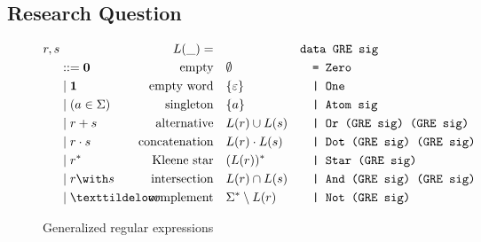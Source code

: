 \subsection{Research Question}
\label{sec:research-question}

\begin{figure}[tp]
  \begin{align*}
    r, s & &L(\_)=\quad &  &
                             \makebox[1em][l]{\texttt{data GRE sig}}\\
         & ::= \Rnull & \ltext{empty}
                        & \emptyset
                           &&\texttt{= Zero}\\
         & \mid \Rempty & \ltext{empty word}
                        & \{ \varepsilon \}
                           && \texttt{| One}\\
         & \mid (a \in \Sigma) & \ltext{singleton}
                        &  \{ a \}
                           && \texttt{| Atom sig} \\
         & \mid \Runion rs & \ltext{alternative}
                        &  L (r) \cup L (s)
                           && \texttt{| Or (GRE sig) (GRE sig)}\\
         & \mid \Rconcat rs & \ltext{concatenation}
                        &  L (r) \cdot L (s)
                           && \texttt{| Dot (GRE sig) (GRE sig)}\\
         & \mid \Rstar r & \ltext{Kleene star}
                        & (L (r))^* 
                           && \texttt{| Star (GRE sig)}\\
         & \mid \Rintersect rs & \ltext{intersection}
                        & L (r) \cap L (s)
                           && \texttt{| And (GRE sig) (GRE sig)}\\
         & \mid \Rcomplement r & \ltext{complement}
                        & \Sigma^* \setminus L (r)
                           && \texttt{| Not (GRE sig)}
  \end{align*}
  \caption{Generalized regular expressions}
  \label{fig:generalized-regular-expressions}
\end{figure}

